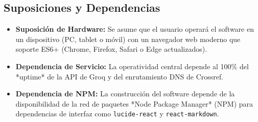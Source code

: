 \subsection{Suposiciones y Dependencias}
\begin{itemize}
    \item \textbf{Suposición de Hardware:} Se asume que el usuario operará el software en un dispositivo (PC, tablet o móvil) con un navegador web moderno que soporte ES6+ (Chrome, Firefox, Safari o Edge actualizados).
    \item \textbf{Dependencia de Servicio:} La operatividad central depende al 100\% del *uptime* de la API de Groq y del enrutamiento DNS de Crossref.
    \item \textbf{Dependencia de NPM:} La construcción del software depende de la disponibilidad de la red de paquetes *Node Package Manager* (NPM) para dependencias de interfaz como \texttt{lucide-react} y \texttt{react-markdown}.
\end{itemize}
